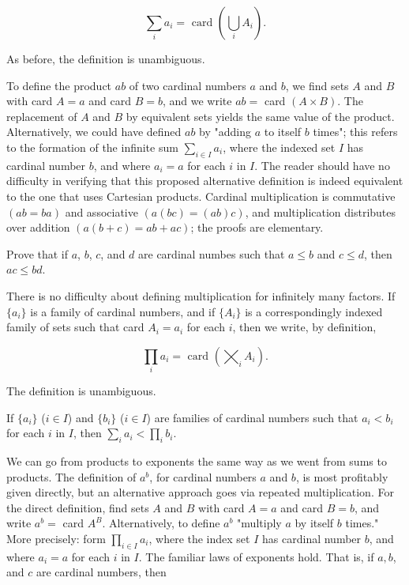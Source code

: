 \begin{equation*}
\sum_{i} a_{i} = \text{ card } (\bigcup_{i} A_{i} ).
\end{equation*}

As before, the definition is unambiguous.

To define the product $ab$ of two cardinal numbers $a$ and $b$, we find sets $A$ and $B$ with card $A = a$ and card $B = b$, and we write $ab =$ card $(A \times B)$. The replacement of $A$ and $B$ by equivalent sets yields the same value of the product. Alternatively, we could have defined $ab$ by "adding $a$ to itself $b$ times"; this refers to the formation of the infinite sum $\sum_{i \in I} a_{i}$, where the indexed set $I$ has cardinal number $b$, and where $a_{i} = a$ for each $i$ in $I$. The reader should have no difficulty in verifying that this proposed alternative definition is indeed equivalent to the one that uses Cartesian products. Cardinal multiplication is commutative $(ab = ba)$ and associative $(a(bc) = (ab)c)$, and multiplication distributes over addition $(a(b + c) = ab + ac)$; the proofs are elementary. 

\begin{exercise} Prove that if $a$, $b$, $c$, and $d$ are cardinal numbes such that $a \le b$ and $c \le d$, then $ac \le bd$.
\end{exercise}

There is no difficulty about defining multiplication for infinitely many factors. If $\{ a_{i} \}$ is a family of cardinal numbers, and if $\{ A_{i} \}$ is a correspondingly indexed family of sets such that card $A_{i} = a_{i}$ for each $i$, then we write, by definition, 

\begin{equation*}
\prod_{i} a_{i} = \text{ card } ( \bigtimes_{i} A_{i} ).
\end{equation*}

The definition is unambiguous. 

\begin{exercise} If $\{ a_{i} \}$ ($i \in I$) and $\{ b_{i} \}$ ($i \in I$) are families of cardinal numbers such that $a_{i} < b_{i}$ for each $i$ in $I$, then $\sum_{i}a_{i} < \prod_{i}b_{i}$. 
\end{exercise}

We can go from products to exponents the same way as we went from sums to products. The definition of $a^{b}$, for cardinal numbers $a$ and $b$, is most profitably given directly, but an alternative approach goes via repeated multiplication. For the direct definition, find sets $A$ and $B$ with card $A = a$ and card $B = b$, and write $a^{b} =$ card $A^{B}$. Alternatively, to define $a^{b}$ "multiply $a$ by itself $b$ times." More precisely: form $\prod_{i \in I} a_{i}$, where the index set $I$ has cardinal number $b$, and where $a_{i} = a$ for each $i$ in $I$. The familiar laws of exponents hold. That is, if $a, b$, and $c$ are cardinal numbers, then 


